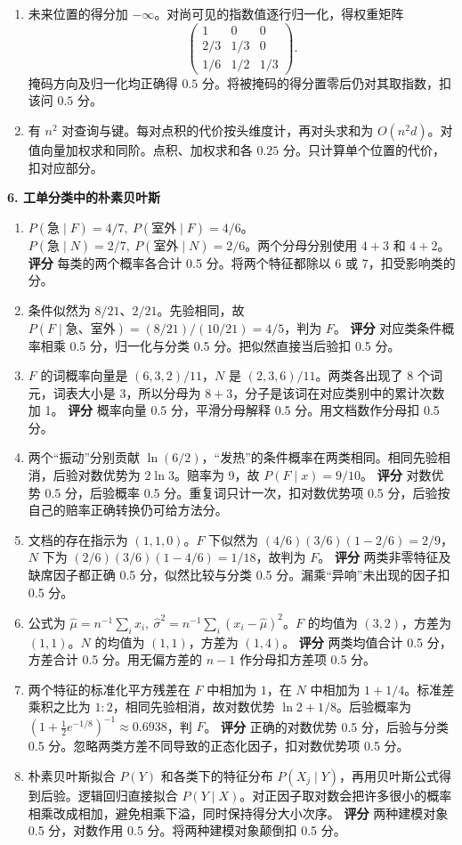 \begin{enumerate}[label=(\arabic*)]
尺寸 $0.5$ 分，参数量 $0.5$ 分。漏掉输出投影或把两个头先求均值，扣对应部分。
\item 未来位置的得分加 $-\infty$。对尚可见的指数值逐行归一化，得权重矩阵
\[
\begin{pmatrix}1&0&0\\2/3&1/3&0\\1/6&1/2&1/3\end{pmatrix}.
\]
掩码方向及归一化均正确得 $0.5$ 分。将被掩码的得分置零后仍对其取指数，扣该问 $0.5$ 分。
\item 有 $n^2$ 对查询与键。每对点积的代价按头维度计，再对头求和为 $O(n^2d)$。对值向量加权求和同阶。点积、加权求和各 $0.25$ 分。只计算单个位置的代价，扣对应部分。
\end{enumerate}

\noindent\textbf{6. 工单分类中的朴素贝叶斯}
\begin{enumerate}[label=(\arabic*)]
\item $P(\text{急}\mid F)=4/7,\ P(\text{室外}\mid F)=4/6$。$P(\text{急}\mid N)=2/7,\ P(\text{室外}\mid N)=2/6$。两个分母分别使用 $4+3$ 和 $4+2$。
\textbf{评分} 每类的两个概率各合计 0.5 分。将两个特征都除以 6 或 7，扣受影响类的分。
\item 条件似然为 $8/21$、$2/21$。先验相同，故 $P(F\mid\text{急、室外})=(8/21)/(10/21)=4/5$，判为 $F$。
\textbf{评分} 对应类条件概率相乘 0.5 分，归一化与分类 0.5 分。把似然直接当后验扣 0.5 分。
\item $F$ 的词概率向量是 $(6,3,2)/11$，$N$ 是 $(2,3,6)/11$。两类各出现了 8 个词元，词表大小是 3，所以分母为 $8+3$，分子是该词在对应类别中的累计次数加 1。
\textbf{评分} 概率向量 0.5 分，平滑分母解释 0.5 分。用文档数作分母扣 0.5 分。
\item 两个“振动”分别贡献 $\ln(6/2)$，“发热”的条件概率在两类相同。相同先验相消，后验对数优势为 $2\ln 3$。赔率为 9，故 $P(F\mid x)=9/10$。
\textbf{评分} 对数优势 0.5 分，后验概率 0.5 分。重复词只计一次，扣对数优势项 0.5 分，后验按自己的赔率正确转换仍可给方法分。
\item 文档的存在指示为 $(1,1,0)$。$F$ 下似然为 $(4/6)(3/6)(1-2/6)=2/9$，$N$ 下为 $(2/6)(3/6)(1-4/6)=1/18$，故判为 $F$。
\textbf{评分} 两类非零特征及缺席因子都正确 0.5 分，似然比较与分类 0.5 分。漏乘“异响”未出现的因子扣 0.5 分。
\item 公式为 $\widehat\mu=n^{-1}\sum_i x_i,\ \widehat\sigma^2=n^{-1}\sum_i(x_i-\widehat\mu)^2$。$F$ 的均值为 $(3,2)$，方差为 $(1,1)$。$N$ 的均值为 $(1,1)$，方差为 $(1,4)$。
\textbf{评分} 两类均值合计 0.5 分，方差合计 0.5 分。用无偏方差的 $n-1$ 作分母扣方差项 0.5 分。
\item 两个特征的标准化平方残差在 $F$ 中相加为 $1$，在 $N$ 中相加为 $1+1/4$。标准差乘积之比为 $1:2$，相同先验相消，故对数优势 $\ln 2+1/8$。后验概率为 $(1+\tfrac12 e^{-1/8})^{-1}\approx0.6938$，判 $F$。
\textbf{评分} 正确的对数优势 0.5 分，后验与分类 0.5 分。忽略两类方差不同导致的正态化因子，扣对数优势项 0.5 分。
\item 朴素贝叶斯拟合 $P(Y)$ 和各类下的特征分布 $P(X_j\mid Y)$，再用贝叶斯公式得到后验。逻辑回归直接拟合 $P(Y\mid X)$。对正因子取对数会把许多很小的概率相乘改成相加，避免相乘下溢，同时保持得分大小次序。
\textbf{评分} 两种建模对象 0.5 分，对数作用 0.5 分。将两种建模对象颠倒扣 0.5 分。
\end{enumerate}

